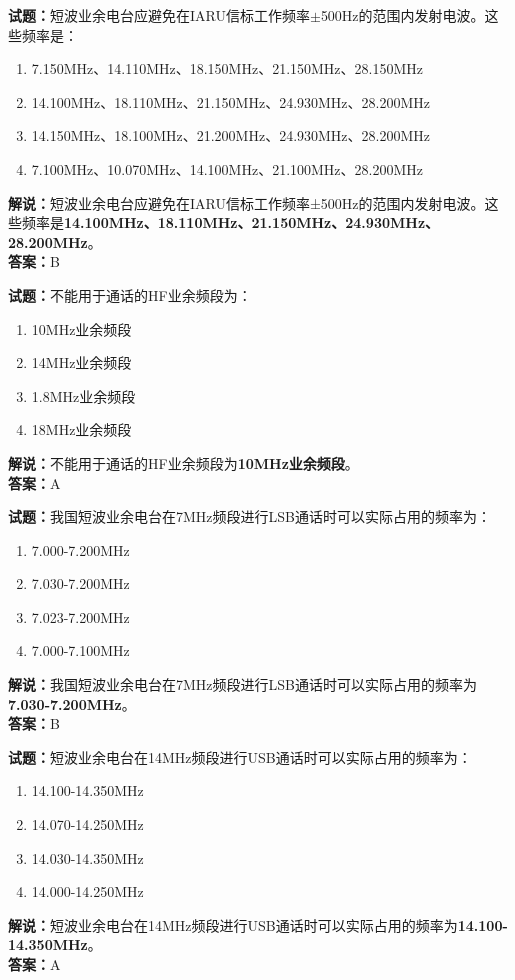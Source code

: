 \documentclass{ctexbook}
\begin{document}
\noindent\textbf{试题：}短波业余电台应避免在IARU信标工作频率$\pm$500Hz的范围内发射电波。这些频率是：
\begin{enumerate}[leftmargin=3em]
\item 7.150MHz、14.110MHz、18.150MHz、21.150MHz、28.150MHz
\item 14.100MHz、18.110MHz、21.150MHz、24.930MHz、28.200MHz
\item 14.150MHz、18.100MHz、21.200MHz、24.930MHz、28.200MHz
\item 7.100MHz、10.070MHz、14.100MHz、21.100MHz、28.200MHz
\end{enumerate}
\noindent\textbf{解说：}短波业余电台应避免在IARU信标工作频率±500Hz的范围内发射电波。这些频率是\textbf{14.100MHz、18.110MHz、21.150MHz、24.930MHz、28.200MHz}。\\\noindent\textbf{答案：}B



\bigskip


\noindent\textbf{试题：}不能用于通话的HF业余频段为：
\begin{enumerate}[leftmargin=3em]
\item 10MHz业余频段
\item 14MHz业余频段
\item 1.8MHz业余频段
\item 18MHz业余频段
\end{enumerate}
\noindent\textbf{解说：}不能用于通话的HF业余频段为\textbf{10MHz业余频段}。\\\noindent\textbf{答案：}A



\bigskip


\noindent\textbf{试题：}我国短波业余电台在7MHz频段进行LSB通话时可以实际占用的频率为：
\begin{enumerate}[leftmargin=3em]
\item 7.000-7.200MHz
\item 7.030-7.200MHz
\item 7.023-7.200MHz
\item 7.000-7.100MHz
\end{enumerate}
\noindent\textbf{解说：}我国短波业余电台在7MHz频段进行LSB通话时可以实际占用的频率为\textbf{7.030-7.200MHz}。\\\noindent\textbf{答案：}B



\bigskip


\noindent\textbf{试题：}短波业余电台在14MHz频段进行USB通话时可以实际占用的频率为：
\begin{enumerate}[leftmargin=3em]
\item 14.100-14.350MHz
\item 14.070-14.250MHz
\item 14.030-14.350MHz
\item 14.000-14.250MHz
\end{enumerate}
\noindent\textbf{解说：}短波业余电台在14MHz频段进行USB通话时可以实际占用的频率为\textbf{14.100-14.350MHz}。\\\noindent\textbf{答案：}A
\end{document}
